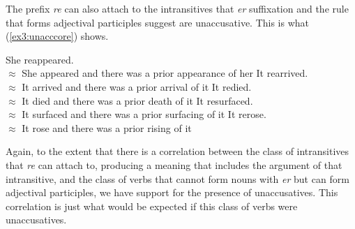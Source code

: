 The prefix \textit{re} can also attach to the intransitives that \textit{er} suffixation and the rule that forms adjectival participles suggest are unaccusative. This is what (\ref{ex3:unacccore}) shows.
\begin{exe}
\raggedright
	\ex \label{ex3:unacccore}
	\begin{xlist}
		\ex She reappeared.\\ $\approx$ She appeared and there was a prior appearance of her
		\ex It rearrived.\\ $\approx$ It arrived and there was a prior arrival of it
		\ex It redied.\\ $\approx$ It died and there was a prior death of it
		\ex It resurfaced.\\ $\approx$ It surfaced and there was a prior surfacing of it
		\ex It rerose.\\ $\approx$ It rose and there was a prior rising of it
	\end{xlist}
\end{exe}
Again, to the extent that there is a correlation between the class of intransitives that \textit{re} can attach to, producing a meaning that includes the argument of that intransitive, and the class of verbs that cannot form nouns with \textit{er} but can form adjectival participles, we have support for the presence of unaccusatives. This correlation is just what would be expected if this class of verbs were unaccusatives. 

